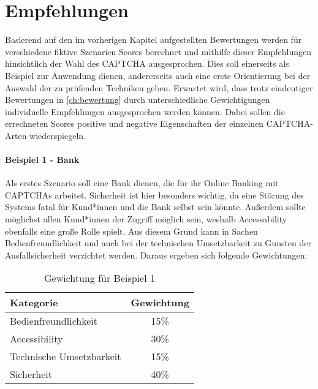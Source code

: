 \chapter{Empfehlungen}
\label{ch:empfehlung}

Basierend auf den im vorherigen Kapitel aufgestellten Bewertungen werden für verschiedene fiktive Szenarien Scores berechnet 
und mithilfe dieser Empfehlungen hinsichtlich der Wahl des CAPTCHA ausgesprochen. 
Dies soll einerseits als Beispiel zur Anwendung dienen, 
andererseits auch eine erste Orientierung bei der Auswahl der zu prüfenden Techniken geben. 
Erwartet wird, dass trotz eindeutiger Bewertungen in \autoref{ch:bewertung} durch unterschiedliche Gewichtigungen
individuelle Empfehlungen ausgesprochen werden können. 
Dabei sollen die errechneten Scores positive und negative Eigenschaften der einzelnen CAPTCHA-Arten wiederspiegeln.

\subsubsection*{Beispiel 1 - Bank}
Als erstes Szenario soll eine Bank dienen, die für ihr Online Banking mit CAPTCHAs arbeitet.
Sicherheit ist hier besonders wichtig, 
da eine Störung des Systems fatal für Kund*innen und die Bank selbst sein könnte.
Außerdem sollte möglichst allen Kund*innen der Zugriff möglich sein, 
weshalb Accessability ebenfalls eine große Rolle spielt.
Aus diesem Grund kann in Sachen Bedienfreundlichkeit 
und auch bei der technischen Umsetzbarkeit zu Gunsten der Ausfallsicherheit verzichtet werden.
Daraus ergeben sich folgende Gewichtungen:

\begin{table}[h!]
    \caption{Gewichtung für Beispiel 1}
    \begin{center}
        \begin{tabular}{l|c}
            Kategorie                       & Gewichtung \\\hline
            Bedienfreundlichkeit            & 15\%         \\
            Accessibility                   & 30\%        \\
            Technische Umsetzbarkeit        & 15\%         \\
            Sicherheit                      & 40\%         
        \end{tabular}
    \end{center}
\end{table}

